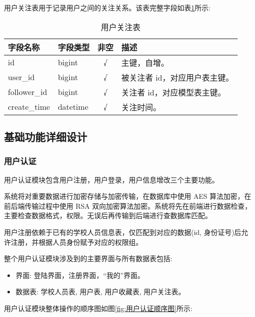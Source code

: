 用户关注表用于记录用户之间的关注关系。该表完整字段如表\ref{table:用户关注表}所示:

\begin{table}[H]
  \centering
  \small
  \caption{用户关注表}
  \label{table:用户关注表}
  \setlength{\tabcolsep}{9mm}
  \begin{tabular}{l|l|c|l}
    \toprule
    \textbf{字段名称} & \textbf{字段类型} & \textbf{非空} & \textbf{描述} \\
    \midrule
    id & bigint & √ & 主键，自增。 \\
    user\_id & bigint & √ & 被关注者 id，对应用户表主键。 \\
    follower\_id & bigint & √ & 关注者 id，对应模型表主键。 \\
    create\_time & datetime & √ & 关注时间。 \\
    \bottomrule
  \end{tabular}
\end{table}

\subsection{基础功能详细设计}

\subsubsection{用户认证}

用户认证模块包含用户注册，用户登录，用户信息增改三个主要功能。

系统将对重要数据进行加密存储与加密传输，在数据库中使用 AES 算法加密，在前后端传输过程中使用 RSA 双向加密算法加密。系统将先在前端进行数据检查，主要检查数据格式，权限。无误后再传输到后端进行查数据库匹配。

用户注册依赖于已有的学校人员信息表，仅匹配到对应的数据(id, 身份证号)后允许注册，并根据人员身份赋予对应的权限组。

整个用户认证模块涉及到的主要界面与所有数据表包括:
\begin{itemize}
  \item 界面: 登陆界面，注册界面，``我的''界面。
  \item 数据表: 学校人员表, 用户表, 用户收藏表, 用户关注表。
\end{itemize}

用户认证模块整体操作的顺序图如图\ref{fig:用户认证顺序图}所示:

